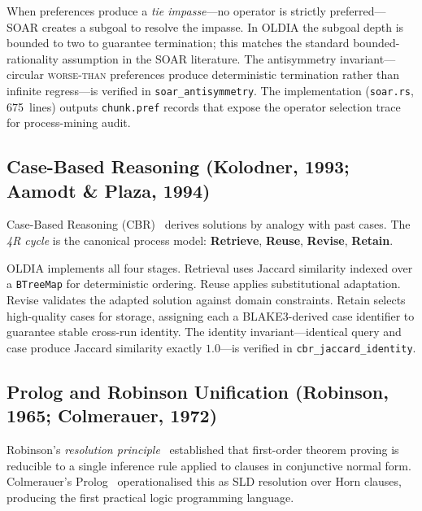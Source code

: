 When preferences produce a \emph{tie impasse}---no operator is strictly
preferred---SOAR creates a subgoal to resolve the impasse.  In OLDIA the
subgoal depth is bounded to two to guarantee termination; this matches the
standard bounded-rationality assumption in the SOAR literature.  The
antisymmetry invariant---circular \textsc{worse-than} preferences produce
deterministic termination rather than infinite regress---is verified in
\texttt{soar\_antisymmetry}.  The implementation (\texttt{soar.rs},
675~lines) outputs \texttt{chunk.pref} records that expose the operator
selection trace for process-mining audit.

\subsection{Case-Based Reasoning (Kolodner, 1993; Aamodt \& Plaza, 1994)}
\label{subsec:cbr}

Case-Based Reasoning (CBR)~\cite{kolodner1993,aamodt1994} derives solutions
by analogy with past cases.  The \emph{4R cycle} is the canonical process
model: \textbf{Retrieve}, \textbf{Reuse}, \textbf{Revise}, \textbf{Retain}.

OLDIA implements all four stages.  Retrieval uses Jaccard similarity indexed
over a \texttt{BTreeMap} for deterministic ordering.  Reuse applies
substitutional adaptation.  Revise validates the adapted solution against
domain constraints.  Retain selects high-quality cases for storage, assigning
each a BLAKE3-derived case identifier to guarantee stable cross-run identity.
The identity invariant---identical query and case produce Jaccard similarity
exactly $1.0$---is verified in \texttt{cbr\_jaccard\_identity}.

\subsection{Prolog and Robinson Unification (Robinson, 1965; Colmerauer, 1972)}
\label{subsec:prolog}

Robinson's \emph{resolution principle}~\cite{robinson1965} established that
first-order theorem proving is reducible to a single inference rule applied to
clauses in conjunctive normal form.  Colmerauer's Prolog~\cite{colmerauer1972}
operationalised this as SLD resolution over Horn clauses, producing the first
practical logic programming language.

